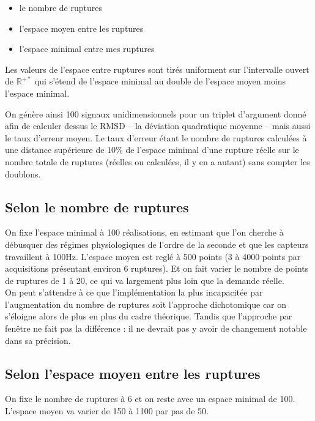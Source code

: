 \documentclass[french,11pt,notitlepage]{report}
\begin{document}
	\begin{itemize}
	\item le nombre de ruptures
	\item l'espace moyen entre les ruptures
	\item l'espace minimal entre mes ruptures\\
	\end{itemize}
	
	Les valeurs de l'espace entre ruptures sont tirés uniforment sur l'intervalle ouvert de $\mathbb R^{+*}$ qui s'étend de l'espace minimal au double de l'espace moyen moins l'espace minimal.
	
	On génère ainsi 100 signaux unidimensionnels pour un triplet d'argument donné afin de calculer dessus le RMSD -- la déviation quadratique moyenne --
	 mais aussi le taux d'erreur moyen.
	Le taux d'erreur étant le nombre de ruptures calculées à une distance supérieure de 10\% de l'espace minimal d'une rupture réelle sur le nombre totale de ruptures (réelles ou calculées, il y en a autant) sans compter les doublons.
	
	
	\subsection{Selon le nombre de ruptures}
	
	
	On fixe l'espace minimal à 100 réalisations, en estimant que l'on cherche à débusquer des régimes physiologiques de l'ordre de la seconde et que les capteurs travaillent à 100Hz.
	L'espace moyen est reglé à 500 points (3 à 4000 points par acquisitions présentant environ 6 ruptures).
	Et on fait varier le nombre de points de ruptures de 1 à 20, ce qui va largement plus loin que la demande réelle.
	\\
	
	On peut s'attendre à ce que l'implémentation la plus incapacitée par l'augmentation du nombre de ruptures soit l'approche dichotomique car on s'éloigne alors de plus en plus du cadre théorique.
	Tandis que l'approche par fenêtre ne fait pas la différence : il ne devrait pas y avoir de changement notable dans sa précision.
	
	\subsection{Selon l'espace moyen entre les ruptures}
	
	On fixe le nombre de ruptures à 6 et on reste avec un espace minimal de 100.
	L'espace moyen va varier de 150 à 1100 par pas de 50.
	
\end{document}
